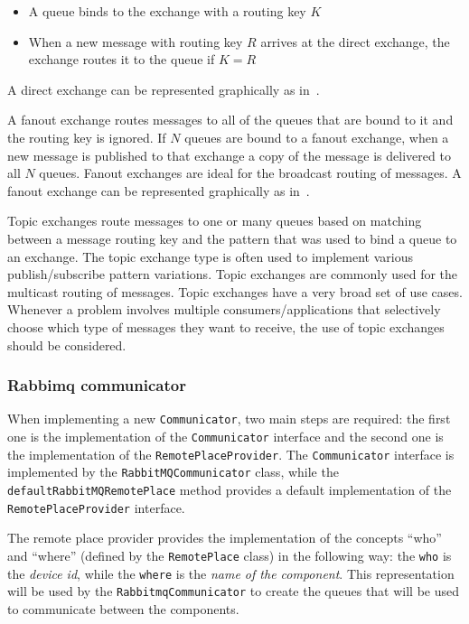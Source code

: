 \begin{itemize}
	\item A queue binds to the exchange with a routing key $K$
	\item When a new message with routing key $R$ arrives at the direct exchange, the exchange routes it to the queue if $K = R$
\end{itemize}

A direct exchange can be represented graphically as in~.

A fanout exchange routes messages to all of the queues that are bound to it and the routing key is ignored. If $N$ queues are bound to a fanout
exchange, when a new message is published to that exchange a copy of the message is delivered to all $N$ queues. Fanout exchanges are ideal for the
broadcast routing of messages. A fanout exchange can be represented graphically as in~.

Topic exchanges route messages to one or many queues based on matching between a message routing key and the pattern that was used to bind a queue to
an exchange. The topic exchange type is often used to implement various publish/subscribe pattern variations. Topic exchanges are commonly used for
the multicast routing of messages. Topic exchanges have a very broad set of use cases. Whenever a problem involves multiple consumers/applications
that selectively choose which type of messages they want to receive, the use of topic exchanges should be considered.

\subsubsection{Rabbimq communicator}

When implementing a new \texttt{Communicator}, two main steps are required: the first one is the implementation of the \texttt{Communicator} interface
and the second one is the implementation of the \texttt{RemotePlaceProvider}.
The \texttt{Communicator} interface is implemented by the \texttt{RabbitMQCommunicator} class, while the \texttt{defaultRabbitMQRemotePlace} method
provides a default implementation of the \texttt{RemotePlaceProvider} interface.

The remote place provider provides the implementation of the concepts ``who'' and ``where'' (defined by the \texttt{RemotePlace} class) in the
following way: the \texttt{who} is the \emph{device id}, while the \texttt{where} is the \emph{name of the component}.
This representation will be used by the \texttt{RabbitmqCommunicator} to create the queues that will be used to communicate between the components.

